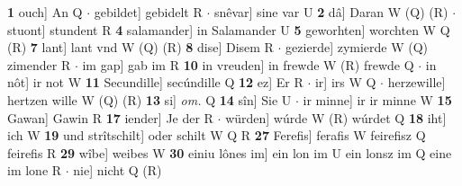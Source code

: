 \documentclass[8pt,a4paper,notitlepage]{article}
\begin{document}
\begin{table}[ht]
\begin{minipage}[t]{0.5\linewidth}
\textbf{1} ouch] An Q  $\cdot$ gebildet] gebidelt R  $\cdot$ snêvar] sine var U \textbf{2} dâ] Daran W (Q) (R)  $\cdot$ stuont] stundent R \textbf{4} salamander] in Salamander U \textbf{5} geworhten] worchten W Q (R) \textbf{7} lant] lant vnd W (Q) (R) \textbf{8} dise] Disem R  $\cdot$ gezierde] zymierde W (Q) zimender R  $\cdot$ im gap] gab im R \textbf{10} in vreuden] in frewde W (R) frewde Q  $\cdot$ in nôt] ir not W \textbf{11} Secundille] secúndille Q \textbf{12} ez] Er R  $\cdot$ ir] irs W Q  $\cdot$ herzewille] hertzen wille W (Q) (R) \textbf{13} si] \textit{om.} Q \textbf{14} sîn] Sie U  $\cdot$ ir minne] ir ir minne W \textbf{15} Gawan] Gawin R \textbf{17} iender] Je der R  $\cdot$ würden] wúrde W (R) wúrdet Q \textbf{18} iht] ich W \textbf{19} und strîtschilt] oder schilt W Q R \textbf{27} Ferefis] ferafis W feirefisz Q feirefis R \textbf{29} wîbe] weibes W \textbf{30} einiu lônes im] ein lon im U ein lonsz im Q eine im lone R  $\cdot$ nie] nicht Q (R) \newline
\end{minipage}
\end{table}
\end{document}
